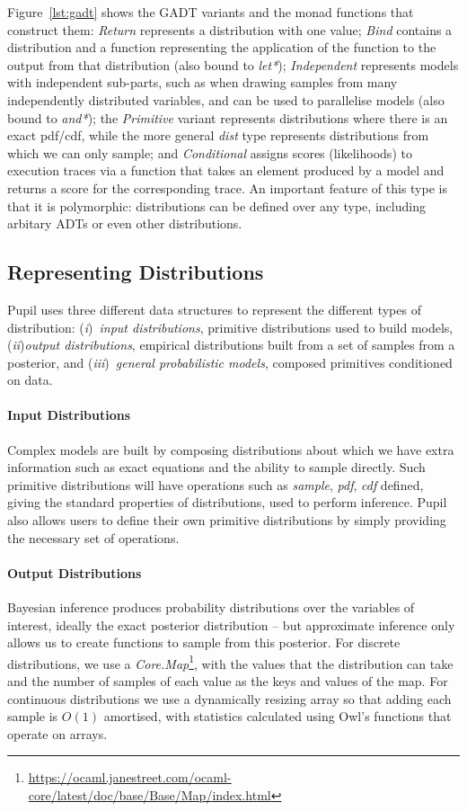 \documentclass[sigconf]{acmart}
\newcommand{\one}{({\em i})\/}
\newcommand{\two}{({\em ii})\/}
\newcommand{\three}{({\em iii})\/}
\newcommand{\pupil}{Pupil\xspace}
\begin{document}
Figure~\ref{lst:gadt} shows the GADT variants and the monad functions that construct them: \emph{Return} represents a distribution with one value; \emph{Bind} contains a distribution and a function representing the application of the function to the output from that distribution (also bound to \emph{let*}); \emph{Independent} represents models with independent sub-parts, such as when drawing samples from many independently distributed variables, and can be used to parallelise models (also bound to \emph{and*}); the \emph{Primitive} variant represents distributions where there is an exact pdf/cdf, while the more general \emph{dist} type represents distributions from which we can only sample; and \emph{Conditional} assigns scores (likelihoods) to execution traces via a function that takes an element produced by a model and returns a score for the corresponding trace. An important feature of this type is that it is polymorphic: distributions can be defined over any type, including arbitary ADTs or even other distributions.

\subsection{Representing Distributions}
\pupil uses three different data structures to represent the different types of distribution: \one~\emph{input distributions}, primitive distributions used to build models, \two\emph{output distributions}, empirical distributions built from a set of samples from a posterior, and \three~\emph{general probabilistic models}, composed primitives conditioned on data.

\paragraph{Input Distributions}
Complex models are built by composing distributions about which we have extra information such as exact equations and the ability to sample directly. Such primitive distributions will have operations such as \emph{sample}, \emph{pdf}, \emph{cdf} defined, giving the standard properties of distributions, used to perform inference. \pupil also allows users to define their own primitive distributions by simply providing the necessary set of operations.

\paragraph{Output Distributions}
Bayesian inference produces probability distributions over the variables of interest, ideally the exact posterior distribution -- but approximate inference only allows us to create functions to sample from this posterior. For discrete distributions, we use a \emph{Core.Map}\footnote{\url{https://ocaml.janestreet.com/ocaml-core/latest/doc/base/Base/Map/index.html}}, with the values that the distribution can take and the number of samples of each value as the keys and values of the map. For continuous distributions we use a dynamically resizing array so that adding each sample is $O(1)$ amortised, with statistics calculated using Owl's functions that operate on arrays.
\end{document}
